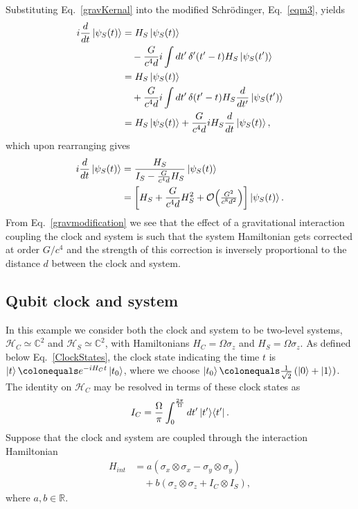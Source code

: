 \documentclass[a4paper,twocolumn,superscriptaddress,11pt,accepted=2019-06-04]{quantumarticle}
\newcommand{\ce}{\colonequals}
\newcommand{\nn}{\nonumber}		%
\begin{document}
{{Substituting Eq.~\eqref{gravKernal} into the modified Schr\"{o}dinger, Eq.~\eqref{eqm3}, yields
\begin{align}
i \frac{d}{dt} \ket{\psi_S(t)} &= H_S \ket{\psi_S(t)} \nn \\
&\quad -\frac{G}{c^4 d} i \int dt' \, \delta'(t'-t) H_S \ket{\psi_S(t')} \nn\\
&= H_S \ket{\psi_S(t)}  \nn \\
&\quad + \frac{G}{c^4 d} i \int dt' \, \delta(t'-t) H_S \frac{d}{dt'}\ket{\psi_S(t')} \nn\\
&= H_S \ket{\psi_S(t)} + \frac{G}{c^4 d} i H_S \frac{d}{dt}\ket{\psi_S(t)}, \nn
\end{align}
which upon rearranging gives
\begin{align}
i  \frac{d}{dt} \ket{\psi_S(t)}  &=  \frac{H_S}{I_S - \frac{G}{c^4 d}  H_S} \ket{\psi_S(t)} \nn \\
&=\left[ H_S +\frac{G}{c^4 d}  H_S^2  + \mathcal{O}\!\left(\tfrac{G^2}{c^8 d^2}\right)\right] \ket{\psi_S(t)}. \label{gravmodification}
\end{align}
From Eq.~\eqref{gravmodification} we see that the effect of a gravitational interaction coupling  the clock and system is such that the system Hamiltonian gets corrected at order $G/c^4$ and the strength of this correction is inversely proportional to the distance $d$ between the clock and system.}
 
\subsection{{Qubit clock and system}}

{In this example we consider both the clock and system to be two-level systems, $\mathcal{H}_C \simeq \mathbb{C}^2$ and $\mathcal{H}_S \simeq \mathbb{C}^2$, with Hamiltonians $H_C = \Omega \sigma_z$ and $H_S = \Omega \sigma_z$. As defined below Eq.~\eqref{ClockStates}, the clock state indicating the time $t$ is  $\ket{t} \ce e^{-i H_C t} \ket{t_0}$, where we choose $\ket{t_0} \ce \tfrac{1}{\sqrt{2}} \left( \ket{0} +  \ket{1} \right)$. The identity on $\mathcal{H}_C$ may be resolved in terms of these clock states as
\begin{align}
I_C = \frac{\Omega}{\pi}  \int_0^{\frac{2 \pi}{ \Omega}} dt' \ket{t'}\!\bra{t'}. \nn %
\end{align}
Suppose that the clock and system are coupled through the interaction Hamiltonian
\begin{align}
H_{int} &=  a \left(\sigma_x \otimes \sigma_x  - \sigma_y \otimes \sigma_y \right)  \nn \\
& \quad + b \left( \sigma_z \otimes \sigma_z + I_C \otimes I_S \right), \label{QubitInteraction}
\end{align}
where $a,b \in \mathbb{R}$.}

}
\end{document}
